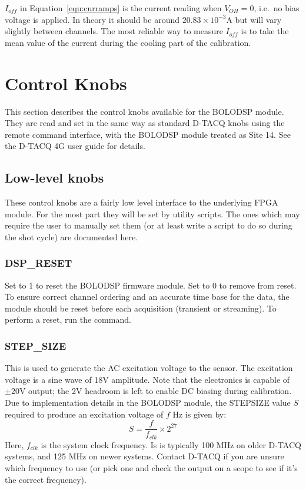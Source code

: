 \documentclass[12pt,a4paper]{article}
\begin{document}
$I_{off}$ in Equation~\ref{equ:curramps} is the current reading when $V_{OH} = 0$, i.e.\ no bias voltage is applied. In theory it should be around
$20.83 \times 10^{-3} \mathrm{A}$ but will vary slightly between channels. The most reliable way to measure $I_{off}$ is to take the mean value of
the current during the cooling part of the calibration.

\section{Control Knobs}
\label{sec:knobs}
This section describes the control knobs available for the BOLODSP module. They are read and set in the same way as standard D-TACQ knobs using the remote
command interface, with the BOLODSP module treated as Site 14. See the D-TACQ 4G user guide for details.

\subsection{Low-level knobs}
\label{sec:knobsll}
These control knobs are a fairly low level interface to the underlying FPGA module. For the most part they will be set by utility scripts. The ones which
may require the user to manually set them (or at least write a script to do so during the shot cycle) are documented here.

\subsubsection{DSP{\_}RESET}
Set to 1 to reset the BOLODSP firmware module. Set to 0 to remove from reset. To ensure correct channel ordering and an accurate time base for the data,
the module should be reset before each acquisition (transient or streaming). To perform a reset, run the \mbox{} command.

\subsubsection{STEP{\_}SIZE}
This is used to generate the AC excitation voltage to the sensor. The excitation voltage is a sine wave of 18V amplitude. Note that the electronics is
capable of $\pm 20\mathrm{V}$ output; the 2V headroom is left to enable DC biasing during calibration. Due to implementation details in the BOLODSP
module, the STEP{\textunderscore}SIZE value $S$ required to produce an excitation voltage of $f$ Hz is given by:
\begin{equation}
  \label{equ:step_size}
  S = \frac{f}{f_{clk}} \times 2^{27}
\end{equation}
Here, $f_{clk}$ is the system clock frequency. Is is typically 100 MHz on older D-TACQ systems, and 125 MHz on newer systems. Contact D-TACQ if you are
unsure which frequency to use (or pick one and check the output on a scope to see if it's the correct frequency).
\end{document}
